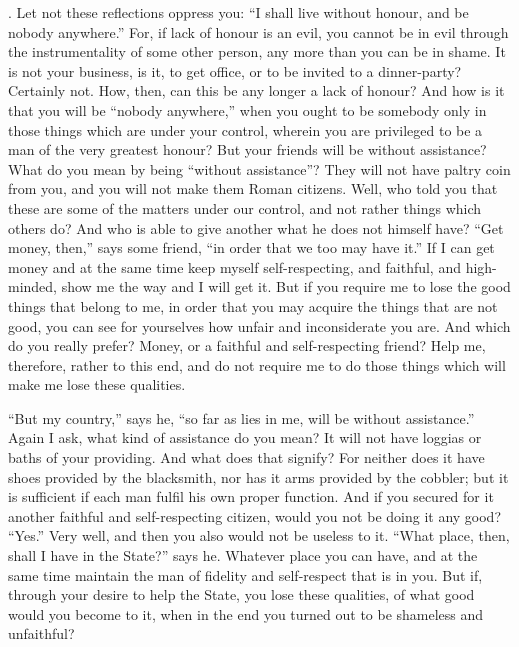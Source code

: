 . Let not these reflections oppress you: ``I shall live without honour, and be nobody anywhere.'' For, if lack of honour is an evil, you cannot be in evil through the instrumentality of some other person, any more than you can be in shame. It is not your business, is it, to get office, or to be invited to a dinner-party? Certainly not. How, then, can this be any longer a lack of honour? And how is it that you will be ``nobody anywhere,'' when you ought to be somebody only in those things which are under your control, wherein you are privileged to be a man of the very greatest honour? But your friends will be without assistance? What do you mean by being ``without assistance''? They will not have paltry coin from you, and you will not make them Roman citizens. Well, who told you that these are some of the matters under our control, and not rather things which others do? And who is able to give another what he does not himself have? ``Get money, then,'' says some friend, ``in order that we too may have it.'' If I can get money and at the same time keep myself self-respecting, and faithful, and high-minded, show me the way and I will get it. But if you require me to lose the good things that belong to me, in order that you may acquire the things that are not good, you can see for yourselves how unfair and inconsiderate you are. And which do you really prefer? Money, or a faithful and self-respecting friend? Help me, therefore, rather to this end, and do not require me to do those things which will make me lose these qualities.

``But my country,'' says he, ``so far as lies in me, will be without assistance.'' Again I ask, what kind of assistance do you mean? It will not have loggias or baths of your providing. And what does that signify? For neither does it have shoes provided by the blacksmith, nor has it arms provided by the cobbler; but it is sufficient if each man fulfil his own proper function. And if you secured for it another faithful and self-respecting citizen, would you not be doing it any good? ``Yes.'' Very well, and then you also would not be useless to it. ``What place, then, shall I have in the State?'' says he. Whatever place you can have, and at the same time maintain the man of fidelity and self-respect that is in you. But if, through your desire to help the State, you lose these qualities, of what good would you become to it, when in the end you turned out to be shameless and unfaithful?

